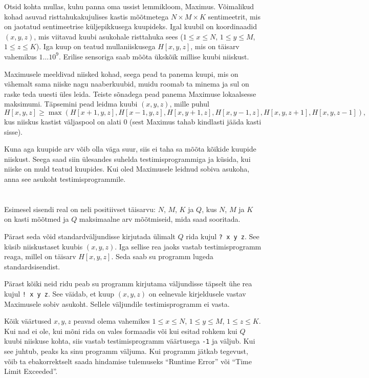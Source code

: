 \ifx\boi\undefined\fi
\def\version{jury-1}

Otsid kohta mullas, kuhu panna oma ussist lemmikloom, Maximus. Võimalikud kohad asuvad risttahukakujulises kastis mõõtmetega $N \times M \times K$ sentimeetrit, mis on jaotatud sentimeetrise küljepikkusega kuupideks. Igal kuubil on koordinaadid $(x,y,z)$, mis viitavad kuubi asukohale risttahuka sees ($1 \le x \le N$, $1 \le y \le M$, $1 \le z \le K$). Iga kuup on teatud mullaniiskusega $H[x,y,z]$, mis on täisarv vahemikus $1 \dots 10^9$. Erilise sensoriga saab mõõta ükskõik millise kuubi niiskust.

Maximusele meeldivad niisked kohad, seega pead ta panema kuupi, mis on vähemalt sama niiske nagu naaberkuubid, muidu roomab ta minema ja sul on raske teda uuesti üles leida.
Teiste sõnadega pead panema Maximuse lokaalsesse maksimumi.
Täpsemini pead leidma kuubi $(x,y,z)$, mille puhul
$$
H[x,y,z] \ge \max(H[x+1,y,z], H[x-1,y,z], H[x,y+1,z], H[x,y-1,z], H[x,y,z+1], H[x,y,z-1]),
$$
kus niiskus kastist väljaspool on alati $0$ (sest Maximus tahab kindlasti jääda kasti sisse).

Kuna aga kuupide arv võib olla väga suur, siis ei taha sa mõõta kõikide kuupide niiskust. Seega saad siin ülesandes suhelda testimisprogrammiga ja küsida, kui niiske on muld teatud kuupides.
Kui oled Maximusele leidnud sobiva asukoha, anna see asukoht testimisprogrammile.

\section*{\interactivity}
Esimesel sisendi real on neli positiivset täisarvu: $N$, $M$, $K$ ja $Q$, kus $N$, $M$ ja $K$ on kasti mõõtmed ja $Q$ maksimaalne arv mõõtmiseid, mida saad sooritada.

Pärast seda võid standardväljundisse kirjutada ülimalt $Q$ rida kujul \texttt{?\ x y z}.
See küsib niiskustaset kuubis $(x, y, z)$.
Iga sellise rea jaoks vastab testimisprogramm reaga, millel on täisarv $H[x,y,z]$. Seda saab su programm lugeda standardsisendist.

Pärast kõiki neid ridu peab su programm kirjutama väljundisse täpselt ühe rea kujul \texttt{!\ x y z}.
See väidab, et kuup $(x, y, z)$ on eelnevale kirjeldusele vastav Maximusele sobiv asukoht.
Sellele väljundile testimisprogramm ei vasta.

Kõik väärtused $x, y, z$ peavad olema vahemikes $1 \le x \le N$, $1 \le y \le M$, $1 \le z \le K$.
Kui nad ei ole, kui mõni rida on vales formaadis või kui esitad rohkem kui $Q$ kuubi niiskuse kohta,
siis vastab testimisprogramm väärtusega \texttt{-1} ja väljub.
Kui see juhtub, peaks ka sinu programm väljuma. Kui programm jätkab tegevust, võib ta ebakorrektselt
saada hindamise tulemuseks ``Runtime Error'' või ``Time Limit Exceeded''.

